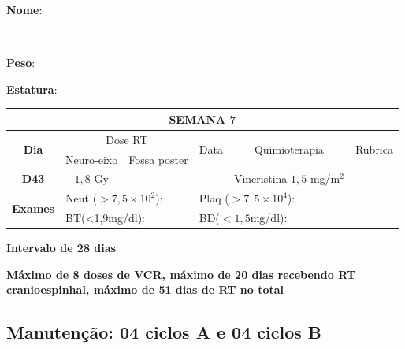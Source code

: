 \documentclass[11pt,a4paper,oldfontcommands]{memoir}
\def\entrywithlabel[#1]#2{\parbox{#1}{{\small #2:} \hrulefill}}
\begin{document}
\begin{center}
\pagebreak
\noindent
\entrywithlabel[1\hsize]{\textbf{Nome}}\hfill
\\[0.3cm]
\entrywithlabel[.45\hsize]{\textbf{Peso}}\hfill  \entrywithlabel[.45\hsize]{\textbf{Estatura}}

\begin{table}[H]
\begin{tabular}{p{1cm}p{2cm}|p{2cm}|p{1cm}|p{4cm}|p{3cm}}
	\hline
	\multicolumn{6}{c}{\textbf{SEMANA 7}}\\
\hline
    \multicolumn{1}{c|}{\multirow{2}{*}{\textbf{Dia}}}&\multicolumn{2}{c|}{Dose RT}&\multicolumn{1}{c|}{\multirow{2}{*}{Data}}&\multicolumn{1}{c|}{\multirow{2}{*}{Quimioterapia}}&\multicolumn{1}{c}{\multirow{2}{*}{Rubrica}} \\
    \cline{2-3}
    \multicolumn{1}{c|}{\multirow{1}{*}{}}&{Neuro-eixo}&{Fossa poster}&& \\
	\hline
	\multicolumn{1}{c|}{\multirow{1}{*}{\textbf{D43}}}&\multicolumn{1}{c|}{\(1,8\) Gy}&&&{Vincristina \(1,5\) mg/m\(^2\)}&\\
    \hline
    \multicolumn{1}{c|}{\multirow{2}{*}{\textbf{Exames}}}&\multicolumn{2}{l|}{Neut (\(>7,5\times10^2\)):}&\multicolumn{2}{l|}{Plaq (\(>7,5\times10^4\)):}&\\
    \cline{2-6}
    \multicolumn{1}{c|}{\multirow{2}{*}{{}}}&\multicolumn{2}{l|}{BT(<1,9mg/dl):}&\multicolumn{2}{l|}{BD(\(<1,5\)mg/dl):}&
    \\
    \hline
\end{tabular}
\end{table}
\textbf{Intervalo de 28 dias}\\
\end{center}
\textbf{Máximo de 8 doses de VCR, máximo de 20 dias recebendo RT cranioespinhal, máximo de 51 dias de RT no total}

\subsection{Manutenção: 04 ciclos A e 04 ciclos B}
\end{document}
